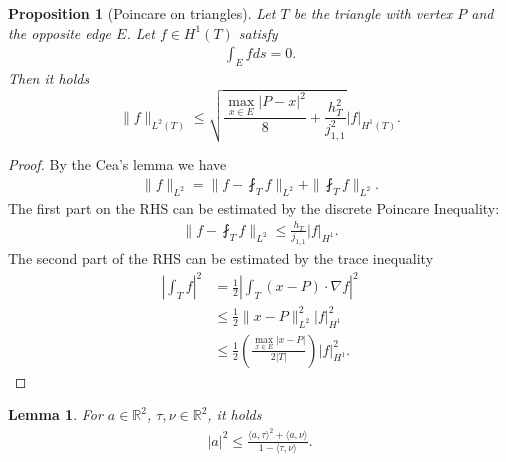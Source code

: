 \documentclass[a4paper,12pt,oneside,fleqn]{book}
\newtheorem{lemma}[theorem]{Lemma}
\newtheorem{proposition}[theorem]{Proposition}
\theoremstyle{definition}
\theoremstyle{remark}
\begin{document}
\begin{proposition}[Poincare on triangles]
	Let $T$ be the triangle with vertex $P$ and the opposite edge $E$. Let $f \in H^1(T)$ satisfy 
	\begin{align*}
		\int_E f ds = 0. 
	\end{align*} 
	Then it holds
	\begin{equation}
		\|f\|_{L^2(T)} \le \sqrt{\frac{\max_{x \in E} |P - x|^2}{8} + \frac{h_T^2}{j_{1, 1}^2}}|f|_{H^1(T)}.
	\end{equation}
\end{proposition}
\begin{proof}
	By the Cea's lemma we have
	\begin{align*}
		\|f\|_{L^2} = \|f - \fint_T f\|_{L^2} + \|\fint_T f \|_{L^2}.
	\end{align*}
	The first part on the RHS can be estimated by the discrete Poincare Inequality:
	\begin{align*}
		\| f - \fint_T f\|_{L^2} \le \frac{h_T}{j_{1,1}} |f|_{H^1}.
	\end{align*}
	The second part of the RHS can be estimated by the trace inequality
	\begin{align*}
		|\int_T f|^2 &= \frac{1}{2} |\int_T (x - P) \cdot \nabla f|^2\\ 
		&\le \frac{1}{2}\|x - P\|_{L^2}^2 |f|_{H^1}^2\\
		&\le \frac{1}{2} (\frac{\max_{x \in E} |x - P|}{2|T|})|f|_{H^1}^2.
	\end{align*}
\end{proof}

\begin{lemma}
	For $a \in \mathbb{R}^2$, $\tau, \nu \in \mathbb{R}^2$, it holds
	\begin{align*}
		|a|^2 \le \frac{\langle a, \tau \rangle^2 + \langle a, \nu \rangle }{1 - \langle \tau, \nu \rangle}.
	\end{align*}
\end{lemma}
\end{document}
